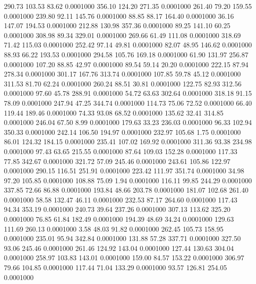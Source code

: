  290.73  103.53   83.62   0.0001000
 356.10  124.20  271.35   0.0001000
 261.40   79.20  159.55   0.0001000
 239.80   92.11  145.76   0.0001000
  88.85   88.17  164.40   0.0001000
  36.16  147.07  194.53   0.0001000
 212.88  130.98  357.36   0.0001000
  89.25  141.10   60.25   0.0001000
 308.98   89.34  329.01   0.0001000
 269.66   61.49  111.08   0.0001000
 318.69   71.42  115.03   0.0001000
 252.42   97.14   49.81   0.0001000
  82.07   48.95  146.62   0.0001000
  88.93   66.22  193.53   0.0001000
 294.58  105.76  169.18   0.0001000
  61.90  131.97  256.87   0.0001000
 107.20   88.85   42.97   0.0001000
  89.54   59.14   20.20   0.0001000
 222.15   87.94  278.34   0.0001000
 301.17  167.76  313.74   0.0001000
 107.85   59.78   45.12   0.0001000
 311.53   81.70   62.24   0.0001000
 260.24   88.51   30.81   0.0001000
 122.75   82.93  312.56   0.0001000
  97.60   45.78  288.91   0.0001000
  54.72   63.63  302.64   0.0001000
 318.18   91.15   78.09   0.0001000
 247.94   47.25  344.74   0.0001000
 114.73   75.06   72.52   0.0001000
  66.40  119.44  189.46   0.0001000
  74.33   93.08   68.52   0.0001000
 135.62   32.41  314.85   0.0001000
 246.04   67.50    8.99   0.0001000
 179.63   33.23  236.03   0.0001000
  96.33  102.94  350.33   0.0001000
 242.14  106.50  194.97   0.0001000
 232.97  105.68    1.75   0.0001000
  86.01  124.32  184.15   0.0001000
 235.41  107.02  169.92   0.0001000
 311.36   93.38  234.98   0.0001000
  97.43   63.65  215.55   0.0001000
  87.64  109.03  152.28   0.0001000
 117.33   77.85  342.67   0.0001000
 321.72   57.09  245.46   0.0001000
 243.61  105.86  122.97   0.0001000
 290.15  116.51  251.91   0.0001000
 223.42  111.97  351.74   0.0001000
  34.98   97.20  105.85   0.0001000
 108.88   75.09    1.94   0.0001000
 116.11   99.85  244.29   0.0001000
 337.85   72.66   86.88   0.0001000
 193.84   48.66  203.78   0.0001000
 181.07  102.68  261.40   0.0001000
  58.58  132.47   46.11   0.0001000
 232.53   87.17  264.60   0.0001000
 117.43   94.34  353.19   0.0001000
 240.73   39.64  237.26   0.0001000
 307.13  113.62  325.20   0.0001000
  76.85   61.84  182.49   0.0001000
 194.39   48.69   34.24   0.0001000
 129.63  111.69  260.13   0.0001000
   3.58   48.03   91.82   0.0001000
 262.45  105.73  158.95   0.0001000
 235.01   95.94  342.84   0.0001000
 131.88   57.28  337.71   0.0001000
 327.50   93.06  245.46   0.0001000
 261.46  124.92  143.04   0.0001000
 127.44  130.63  304.04   0.0001000
 258.97  103.83  143.01   0.0001000
 159.00   84.57  153.22   0.0001000
 306.97   79.66  104.85   0.0001000
 117.44   71.04  133.29   0.0001000
  93.57  126.81  254.05   0.0001000
